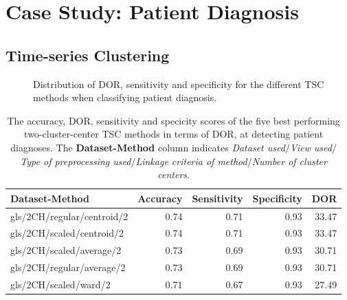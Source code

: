 \section{Case Study: Patient Diagnosis}

\subsection{Time-series Clustering}

\begin{figure}[htb]
    \centering
    
    \caption{Distribution of DOR, sensitivity and specificity for the different TSC methods when classifying patient diagnosis.}
    \label{fig:tsc_ind_dor_sens_spec_dist}
\end{figure}

\begin{table}
    \centering
    \begin{tabular}{lrrrr}
        \toprule
        Dataset-Method             &  Accuracy &  Sensitivity &  Specificity &   DOR \\
        \midrule
        gls/2CH/regular/centroid/2 &      0.74 &         0.71 &         0.93 & 33.47 \\
        gls/2CH/scaled/centroid/2  &      0.74 &         0.71 &         0.93 & 33.47 \\
        gls/2CH/scaled/average/2   &      0.73 &         0.69 &         0.93 & 30.71 \\
        gls/2CH/regular/average/2  &      0.73 &         0.69 &         0.93 & 30.71 \\
        gls/2CH/scaled/ward/2      &      0.71 &         0.67 &         0.93 & 27.49 \\
        \bottomrule
    \end{tabular}
    \caption{The accuracy, DOR, sensitivity and specicity scores of the five best performing two-cluster-center TSC methods in terms of DOR, at detecting patient diagnoses.
             The \textbf{Dataset-Method} column indicates 
             \textit{Dataset used}$/$\textit{View used}$/$\textit{Type of preprocessing used}$/$\textit{Linkage criteria of method}$/$\textit{Number of cluster centers}.}
    \label{tab:tsc_ind_dor_sens_spec_dist}
\end{table}

